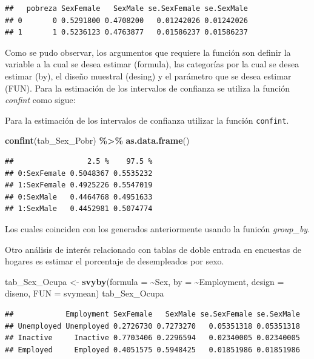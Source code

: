 \documentclass[
  12pt,
]{book}
\newenvironment{Shaded}{\begin{snugshade}}{\end{snugshade}}
\newcommand{\AttributeTok}[1]{\textcolor[rgb]{0.13,0.29,0.53}{#1}}
\newcommand{\FunctionTok}[1]{\textcolor[rgb]{0.13,0.29,0.53}{\textbf{#1}}}
\newcommand{\NormalTok}[1]{#1}
\newcommand{\OtherTok}[1]{\textcolor[rgb]{0.56,0.35,0.01}{#1}}
\newcommand{\SpecialCharTok}[1]{\textcolor[rgb]{0.81,0.36,0.00}{\textbf{#1}}}
\begin{document}
\begin{verbatim}
##   pobreza SexFemale   SexMale se.SexFemale se.SexMale
## 0       0 0.5291800 0.4708200   0.01242026 0.01242026
## 1       1 0.5236123 0.4763877   0.01586237 0.01586237
\end{verbatim}

Como se pudo observar, los argumentos que requiere la función son definir la variable a la cual se desea estimar (formula), las categorías por la cual se desea estimar (by), el diseño muestral (desing) y el parámetro que se desea estimar (FUN). Para la estimación de los intervalos de confianza se utiliza la función \emph{confint} como sigue:

Para la estimación de los intervalos de confianza utilizar la función \texttt{confint}.

\begin{Shaded}
\begin{Highlighting}[]
\FunctionTok{confint}\NormalTok{(tab\_Sex\_Pobr) }\SpecialCharTok{\%\textgreater{}\%} \FunctionTok{as.data.frame}\NormalTok{()}
\end{Highlighting}
\end{Shaded}

\begin{verbatim}
##                 2.5 %    97.5 %
## 0:SexFemale 0.5048367 0.5535232
## 1:SexFemale 0.4925226 0.5547019
## 0:SexMale   0.4464768 0.4951633
## 1:SexMale   0.4452981 0.5074774
\end{verbatim}

Los cuales coinciden con los generados anteriormente usando la funicón \emph{group\_by}.

Otro análisis de interés relacionado con tablas de doble entrada en encuestas de hogares es estimar el porcentaje de desempleados por sexo.

\begin{Shaded}
\begin{Highlighting}[]
\NormalTok{tab\_Sex\_Ocupa }\OtherTok{\textless{}{-}} \FunctionTok{svyby}\NormalTok{(}\AttributeTok{formula =} \SpecialCharTok{\textasciitilde{}}\NormalTok{Sex,  }\AttributeTok{by =} \SpecialCharTok{\textasciitilde{}}\NormalTok{Employment,}
                       \AttributeTok{design =}\NormalTok{ diseno, }\AttributeTok{FUN =}\NormalTok{ svymean)}
\NormalTok{tab\_Sex\_Ocupa}
\end{Highlighting}
\end{Shaded}

\begin{verbatim}
##            Employment SexFemale   SexMale se.SexFemale se.SexMale
## Unemployed Unemployed 0.2726730 0.7273270   0.05351318 0.05351318
## Inactive     Inactive 0.7703406 0.2296594   0.02340005 0.02340005
## Employed     Employed 0.4051575 0.5948425   0.01851986 0.01851986
\end{verbatim}
\end{document}
